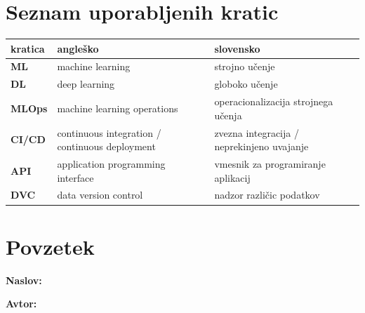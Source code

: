 \clearemptydoublepage{}


\pagestyle{empty}
\def\thepage{}%
\tableofcontents{}


\clearemptydoublepage{}

\chapter*{Seznam uporabljenih kratic}

\noindent\begin{tabular}{p{}|p{}|p{}}
  {\bf kratica} & {\bf angleško}                                  & {\bf slovensko}                          \\ \hline
  {\bf ML}      & machine learning                                & strojno učenje                           \\
  {\bf DL}      & deep learning                                   & globoko učenje                           \\
  {\bf MLOps}   & machine learning operations                     & operacionalizacija strojnega učenja      \\
  {\bf CI/CD}   & continuous integration / continuous deployment  & zvezna integracija / neprekinjeno uvajanje \\
  {\bf API}     & application programming interface               & vmesnik za programiranje aplikacij       \\
  {\bf DVC}     & data version control                            & nadzor različic podatkov                 \\
\end{tabular}


\clearemptydoublepage{}

\chapter*{Povzetek}

\noindent\textbf{Naslov:} \ttitle{}
\bigskip

\noindent\textbf{Avtor:} \tauthor{}
\bigskip

